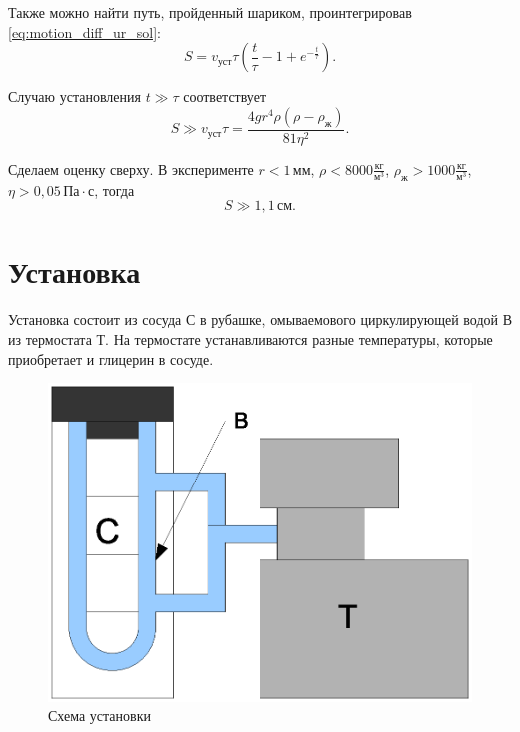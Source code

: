 \documentclass[12pt]{article}
\begin{document}
	Также можно найти путь, пройденный шариком, проинтегрировав \eqref{eq:motion_diff_ur_sol}:
	\begin{equation}
	\label{eq:motion_dist}
	S = v_\text{уст} \tau \left( \frac{t}{\tau}-1+e^{-\frac{t}{\tau}} \right).
	\end{equation}
	
	Случаю установления $t \gg \tau$ соответствует
	\begin{equation}
	\label{eq:dist_gg}
	S \gg v_\text{уст} \tau = \frac{4gr^4 \rho \left( \rho -\rho_\text{ж} \right)}{81\eta^2}.
	\end{equation}
	
	Сделаем оценку сверху. В эксперименте $r < 1 \,\text{мм}$, $\rho < 8000\frac{\text{кг}}{\text{м}^3}$, $\rho_\text{ж} > 1000 \frac{\text{кг}}{\text{м}^3}$, $\eta > 0{,}05 \,\text{Па}\cdot \text{с}$, тогда
	\begin{equation}
	\label{eq:dist_gg_oc_up}
	S \gg 1,1 \,\text{см}.
	\end{equation}
	
	\section*{Установка}
	
	Установка состоит из сосуда С в рубашке, омываемового циркулирующей водой В из термостата Т. На термостате устанавливаются разные температуры, которые приобретает и глицерин в сосуде.
	
	\begin{figure}[h!]
	\caption{Схема установки}
	\label{fig:scheme}
	\begin{center}
	\includegraphics[scale=1]{scheme.eps}
	\end{center}
	\end{figure}
	
\end{document}
